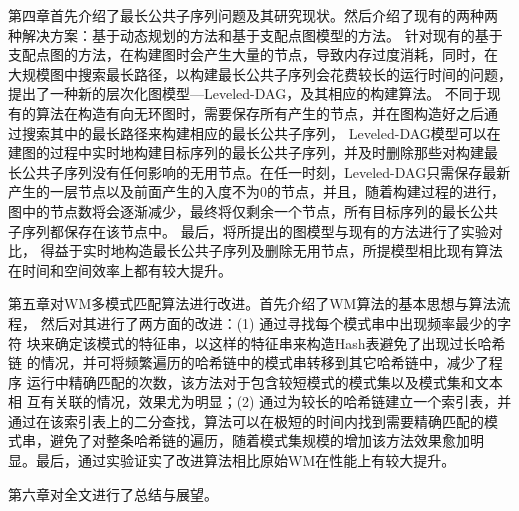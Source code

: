 第四章首先介绍了最长公共子序列问题及其研究现状。然后介绍了现有的两种两
种解决方案：基于动态规划的方法和基于支配点图模型的方法。 针对现有的基于
支配点图的方法，在构建图时会产生大量的节点，导致内存过度消耗，同时，在
大规模图中搜索最长路径，以构建最长公共子序列会花费较长的运行时间的问题，
提出了一种新的层次化图模型---Leveled-DAG，及其相应的构建算法。 不同于现
有的算法在构造有向无环图时，需要保存所有产生的节点，并在图构造好之后通
过搜索其中的最长路径来构建相应的最长公共子序列， Leveled-DAG模型可以在
建图的过程中实时地构建目标序列的最长公共子序列，并及时删除那些对构建最
长公共子序列没有任何影响的无用节点。在任一时刻，Leveled-DAG只需保存最新
产生的一层节点以及前面产生的入度不为0的节点，并且，随着构建过程的进行，
图中的节点数将会逐渐减少，最终将仅剩余一个节点，所有目标序列的最长公共
子序列都保存在该节点中。 最后，将所提出的图模型与现有的方法进行了实验对
比， 得益于实时地构造最长公共子序列及删除无用节点，所提模型相比现有算法
在时间和空间效率上都有较大提升。

第五章对WM多模式匹配算法进行改进。首先介绍了WM算法的基本思想与算法流程，
然后对其进行了两方面的改进：(1) 通过寻找每个模式串中出现频率最少的字符
块来确定该模式的特征串，以这样的特征串来构造Hash表避免了出现过长哈希链
的情况，并可将频繁遍历的哈希链中的模式串转移到其它哈希链中，减少了程序
运行中精确匹配的次数，该方法对于包含较短模式的模式集以及模式集和文本相
互有关联的情况，效果尤为明显；(2) 通过为较长的哈希链建立一个索引表，并
通过在该索引表上的二分查找，算法可以在极短的时间内找到需要精确匹配的模
式串，避免了对整条哈希链的遍历，随着模式集规模的增加该方法效果愈加明
显。最后，通过实验证实了改进算法相比原始WM在性能上有较大提升。

第六章对全文进行了总结与展望。
